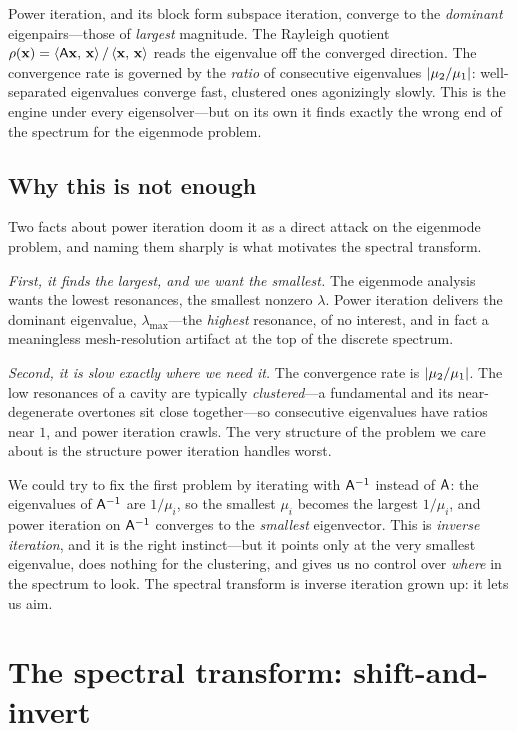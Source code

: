 \begin{keyidea}
Power iteration, and its block form subspace iteration, converge to the
\emph{dominant} eigenpairs---those of \emph{largest} magnitude. The Rayleigh
quotient $\rho(\mathbf{x})=\left\langle \mathsf{A}\mathbf{x},\, \mathbf{x}\right\rangle/\left\langle \mathbf{x},\, \mathbf{x}\right\rangle$ reads the eigenvalue
off the converged direction. The convergence rate is governed by the
\emph{ratio} of consecutive eigenvalues $\lvert\mu_2/\mu_1\rvert$: well-separated
eigenvalues converge fast, clustered ones agonizingly slowly. This is the engine
under every eigensolver---but on its own it finds exactly the wrong end of the
spectrum for the eigenmode problem.
\end{keyidea}

\subsection{Why this is not enough}

Two facts about power iteration doom it as a direct attack on the eigenmode
problem, and naming them sharply is what motivates the spectral transform.

\emph{First, it finds the largest, and we want the smallest.} The eigenmode
analysis wants the lowest resonances, the smallest nonzero $\lambda$. Power
iteration delivers the dominant eigenvalue, $\lambda_{\max}$---the
\emph{highest} resonance, of no interest, and in fact a meaningless mesh-resolution
artifact at the top of the discrete spectrum.

\emph{Second, it is slow exactly where we need it.} The convergence rate is
$\lvert\mu_2/\mu_1\rvert$. The low resonances of a cavity are typically
\emph{clustered}---a fundamental and its near-degenerate overtones sit close
together---so consecutive eigenvalues have ratios near $1$, and power iteration
crawls. The very structure of the problem we care about is the structure power
iteration handles worst.

We could try to fix the first problem by iterating with $\mathsf{A}^{-1}$ instead of
$\mathsf{A}$: the eigenvalues of $\mathsf{A}^{-1}$ are $1/\mu_i$, so the smallest $\mu_i$
becomes the largest $1/\mu_i$, and power iteration on $\mathsf{A}^{-1}$ converges to
the \emph{smallest} eigenvector. This is \emph{inverse iteration}, and it is the
right instinct---but it points only at the very smallest eigenvalue, does nothing
for the clustering, and gives us no control over \emph{where} in the spectrum to
look. The spectral transform is inverse iteration grown up: it lets us aim.

\section{The spectral transform: shift-and-invert}
\label{sec:shift-invert}

